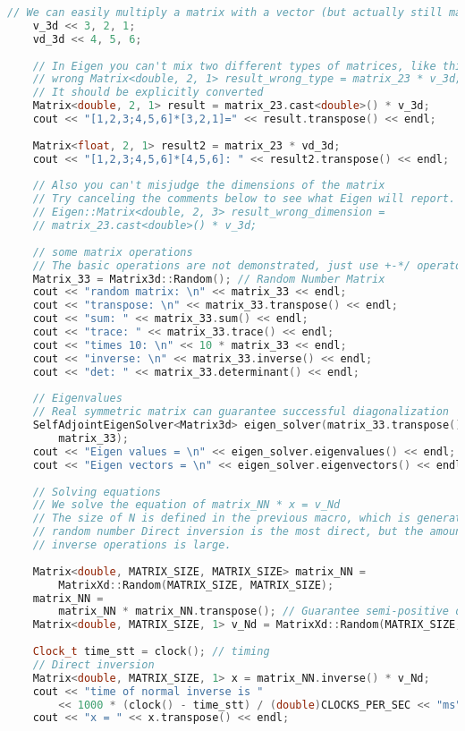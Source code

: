 \begin{lstlisting}[language=c++,caption=slambook2/ch3/useEigen/eigenMatrix.cpp]
    // We can easily multiply a matrix with a vector (but actually still matrices and matrices)
    v_3d << 3, 2, 1;
    vd_3d << 4, 5, 6;
    
    // In Eigen you can't mix two different types of matrices, like this is
    // wrong Matrix<double, 2, 1> result_wrong_type = matrix_23 * v_3d; 
    // It should be explicitly converted
    Matrix<double, 2, 1> result = matrix_23.cast<double>() * v_3d;
    cout << "[1,2,3;4,5,6]*[3,2,1]=" << result.transpose() << endl;
    
    Matrix<float, 2, 1> result2 = matrix_23 * vd_3d;
    cout << "[1,2,3;4,5,6]*[4,5,6]: " << result2.transpose() << endl;
    
    // Also you can't misjudge the dimensions of the matrix
    // Try canceling the comments below to see what Eigen will report.
    // Eigen::Matrix<double, 2, 3> result_wrong_dimension =
    // matrix_23.cast<double>() * v_3d;
    
    // some matrix operations
    // The basic operations are not demonstrated, just use +-*/ operators.
    Matrix_33 = Matrix3d::Random(); // Random Number Matrix
    cout << "random matrix: \n" << matrix_33 << endl;
    cout << "transpose: \n" << matrix_33.transpose() << endl;
    cout << "sum: " << matrix_33.sum() << endl;
    cout << "trace: " << matrix_33.trace() << endl;
    cout << "times 10: \n" << 10 * matrix_33 << endl;
    cout << "inverse: \n" << matrix_33.inverse() << endl;
    cout << "det: " << matrix_33.determinant() << endl;
    
    // Eigenvalues
    // Real symmetric matrix can guarantee successful diagonalization
    SelfAdjointEigenSolver<Matrix3d> eigen_solver(matrix_33.transpose() *
	    matrix_33);
    cout << "Eigen values = \n" << eigen_solver.eigenvalues() << endl;
    cout << "Eigen vectors = \n" << eigen_solver.eigenvectors() << endl;
    
    // Solving equations
    // We solve the equation of matrix_NN * x = v_Nd
    // The size of N is defined in the previous macro, which is generated by a
    // random number Direct inversion is the most direct, but the amount of
    // inverse operations is large.
    
    Matrix<double, MATRIX_SIZE, MATRIX_SIZE> matrix_NN =
	    MatrixXd::Random(MATRIX_SIZE, MATRIX_SIZE);
    matrix_NN =
	    matrix_NN * matrix_NN.transpose(); // Guarantee semi-positive definite
    Matrix<double, MATRIX_SIZE, 1> v_Nd = MatrixXd::Random(MATRIX_SIZE, 1);
    
    Clock_t time_stt = clock(); // timing
    // Direct inversion
    Matrix<double, MATRIX_SIZE, 1> x = matrix_NN.inverse() * v_Nd;
    cout << "time of normal inverse is "
	    << 1000 * (clock() - time_stt) / (double)CLOCKS_PER_SEC << "ms" << endl;
    cout << "x = " << x.transpose() << endl;
    

\end{lstlisting}

